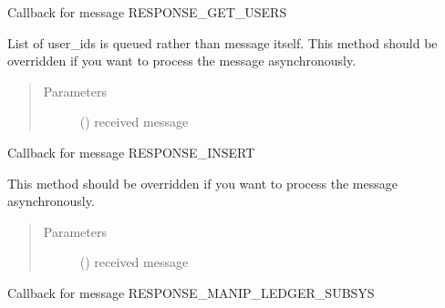 \documentclass[letterpaper,10pt,english]{sphinxmanual}
\begin{document}
\begin{fulllineitems}

\begin{fulllineitems}
\label{\detokenize{bbc1.core.bbc_app:bbc1.core.bbc_app.Callback.proc_resp_get_userlist}}
Callback for message RESPONSE\_GET\_USERS

List of user\_ids is queued rather than message itself.
This method should be overridden if you want to process the message asynchronously.
\begin{quote}\begin{description}
\item[{Parameters}] \leavevmode
{} () \textendash{} received message

\end{description}\end{quote}

\end{fulllineitems}


\begin{fulllineitems}
\label{\detokenize{bbc1.core.bbc_app:bbc1.core.bbc_app.Callback.proc_resp_insert}}
Callback for message RESPONSE\_INSERT

This method should be overridden if you want to process the message asynchronously.
\begin{quote}\begin{description}
\item[{Parameters}] \leavevmode
{} () \textendash{} received message

\end{description}\end{quote}

\end{fulllineitems}


\begin{fulllineitems}
\label{\detokenize{bbc1.core.bbc_app:bbc1.core.bbc_app.Callback.proc_resp_ledger_subsystem}}
Callback for message RESPONSE\_MANIP\_LEDGER\_SUBSYS


\end{fulllineitems}
\end{fulllineitems}
\end{document}
